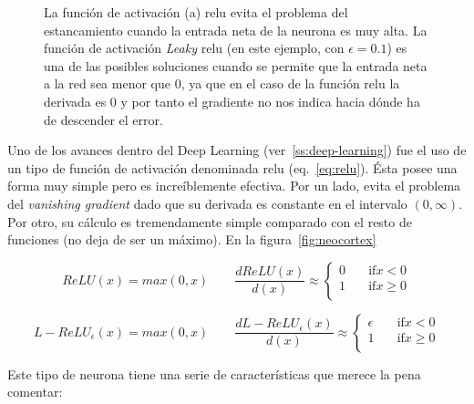 \begin{figure}
	\centering
	\qquad
	\caption[Funciones de activación: \acrshort{relu} y Leaky-\acrshort{relu}.]{La función de activación (a) \gls{relu} evita el problema del estancamiento cuando la entrada neta de la neurona es muy alta. La función de activación \textit{Leaky} \gls{relu} (en este ejemplo, con $\epsilon = 0.1$) es una de las posibles soluciones cuando se permite que la entrada neta a la red sea menor que 0, ya que en el caso de la función \gls{relu} la derivada es 0 y por tanto el gradiente no nos indica hacia dónde ha de descender el error.}
	\label{fig:relu-and-leaky-relu}
\end{figure}

Uno de los avances dentro del Deep Learning (ver~\ref{ss:deep-learning}) fue el uso de un tipo de función de activación denominada \acrfull{relu} (eq.~\ref{eq:relu}). Ésta posee una forma muy simple pero es increíblemente efectiva. Por un lado, evita el problema del \textit{vanishing gradient} dado que su derivada es constante en el intervalo $(0, \infty)$. Por otro, su cálculo es tremendamente simple comparado con el resto de funciones (no deja de ser un máximo). En la figura~\ref{fig:neocortex}

\begin{equation}
ReLU(x) = max(0, x) \qquad
\frac{d ReLU(x)}{d(x)} \approx
\begin{cases}
0 &\quad\text{if} x < 0 \\
1 &\quad\text{if} x \geq 0 \\
\end{cases}
\label{eq:relu}
\end{equation}

\begin{equation}
L-ReLU_\epsilon(x) = max(0, x) \qquad
\frac{d L-ReLU_\epsilon(x)}{d(x)} \approx
\begin{cases}
\epsilon &\quad\text{if} x < 0 \\
1 &\quad\text{if} x \geq 0 \\
\end{cases}
\label{eq:leaky-relu}
\end{equation}

Este tipo de neurona tiene una serie de características que merece la pena comentar:

